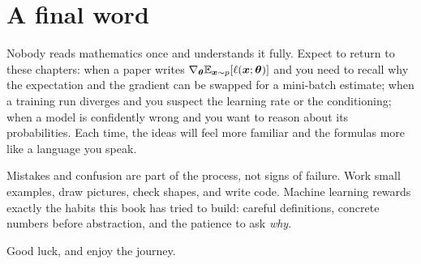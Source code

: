 \section{A final word}\label{sec:final-word}

Nobody reads mathematics once and understands it fully. Expect to return to
these chapters: when a paper writes $\nabla_{\bm{\theta}}\mathbb{E}_{\bm{x}\sim p}[\ell(\bm{x};
\bm{\theta})]$ and you need to recall why the expectation and the gradient can be
swapped for a mini-batch estimate; when a training run diverges and you suspect the
learning rate or the conditioning; when a model is confidently wrong and you want
to reason about its probabilities. Each time, the ideas will feel more familiar
and the formulas more like a language you speak.

Mistakes and confusion are part of the process, not signs of failure. Work small
examples, draw pictures, check shapes, and write code. Machine learning rewards
exactly the habits this book has tried to build: careful definitions, concrete
numbers before abstraction, and the patience to ask \emph{why}.

Good luck, and enjoy the journey.
